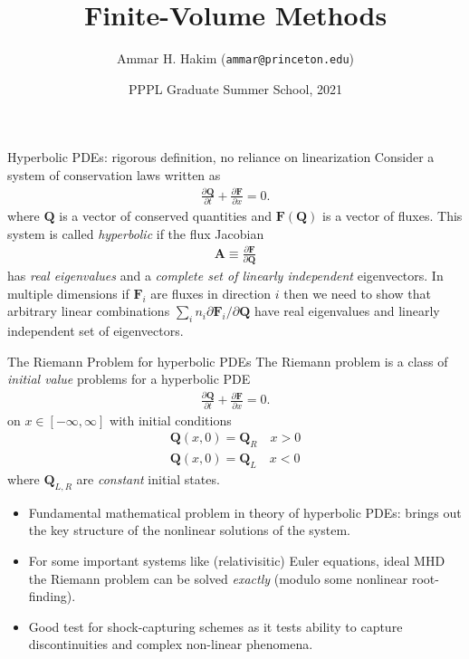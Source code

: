 \documentclass[aspectratio=169]{beamer}
\title[{\tt }]{Finite-Volume Methods}
\author[http://cmpp.rtfd.io]%
{Ammar H. Hakim ({\tt ammar@princeton.edu}) \inst{1}}%
\institute[PPPL]
{ \inst{1} Princeton Plasma Physics Laboratory, Princeton, NJ %
}
\date[8/20/2021]{PPPL Graduate Summer School, 2021}
\newcommand{\mypause}{}
\newcommand{\pfrac}[2]{\frac{\partial #1}{\partial #2}}
\newcommand{\mvec}[1]{\mathbf{#1}}
\begin{document}
\begin{frame}[plain]
  \titlepage
\end{frame}

\begin{frame}{Hyperbolic PDEs: rigorous definition, no reliance on
    linearization}
  Consider a system of conservation laws written as
  \begin{align*}
    \pfrac{\mvec{Q}}{t} + \pfrac{\mvec{F}}{x} = 0.
  \end{align*}
  where $\mvec{Q}$ is a vector of conserved quantities and
  $\mvec{F}(\mvec{Q})$ is a vector of fluxes. This system is called
  \emph{hyperbolic} if the flux Jacobian
  \begin{align*}
    \mvec{A} \equiv \pfrac{\mvec{F}}{\mvec{Q}}
  \end{align*}
  has \emph{real eigenvalues} and a \emph{complete set of linearly
    independent} eigenvectors. In multiple dimensions if $\mvec{F}_i$
  are fluxes in direction $i$ then we need to show that arbitrary
  linear combinations
  $\sum_i n_i {\partial\mvec{F}_i}/{\partial\mvec{Q}}$ have real
  eigenvalues and linearly independent set of eigenvectors.
  
\end{frame}

\begin{frame}{The Riemann Problem for hyperbolic PDEs}
  \small%
  The Riemann problem is a class of \emph{initial value} problems for
  a hyperbolic PDE
  \begin{align*}
    \pfrac{\mvec{Q}}{t} + \pfrac{\mvec{F}}{x} = 0.
  \end{align*}
  on $x\in[-\infty,\infty]$ with initial conditions
  \begin{align*}
    \mvec{Q}(x,0) = \mvec{Q}_R \quad x>0 \\
    \mvec{Q}(x,0) = \mvec{Q}_L \quad x<0    
  \end{align*}
  where $\mvec{Q}_{L,R}$ are \emph{constant} initial states.%
  \mypause%
  \begin{itemize}
  \item Fundamental mathematical problem in theory of hyperbolic PDEs:
    brings out the key structure of the nonlinear solutions of the
    system.
  \item For some important systems like (relativisitic) Euler
    equations, ideal MHD the Riemann problem can be solved
    \emph{exactly} (modulo some nonlinear root-finding).
  \item Good test for shock-capturing schemes as it tests ability to
    capture discontinuities and complex non-linear phenomena.
  \end{itemize}
\end{frame}  
\end{document}
